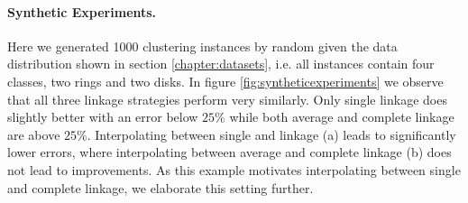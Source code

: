 \paragraph{Synthetic Experiments.} Here we generated 1000 clustering instances by random given the data distribution shown in section \ref{chapter:datasets}, i.e. all instances contain four classes, two rings and two disks. In figure \ref{fig:syntheticexperiments} we observe that all three linkage strategies perform very similarly. Only single linkage does slightly better with an error below $25\%$ while both average and complete linkage are above $25\%$. Interpolating between single and linkage (a) leads to significantly lower errors, where interpolating between average and complete linkage (b) does not lead to improvements. As this example motivates interpolating between single and complete linkage, we elaborate this setting further.

